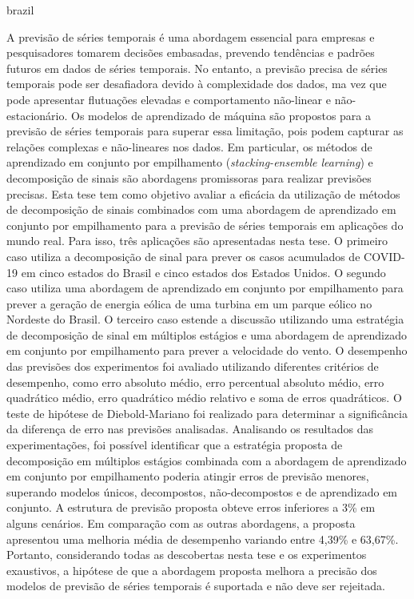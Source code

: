 \setlength{\absparsep}{18pt} %
\begin{resumo}[Resumo]
\begin{otherlanguage*}{brazil}

A previs\~ao de s\'eries temporais \'e uma abordagem essencial para empresas e pesquisadores tomarem decis\~oes embasadas, prevendo tend\^encias e padr\~oes futuros em dados de s\'eries temporais. 
%
No entanto, a previs\~ao precisa de s\'eries temporais pode ser desafiadora devido \`a complexidade dos dados, ma vez que pode apresentar flutua\c{c}\~oes elevadas e comportamento n\~ao-linear e n\~ao-estacion\'ario. 
%
Os modelos de aprendizado de m\'aquina s\~ao propostos para a previs\~ao de s\'eries temporais para superar essa limita\c{c}\~ao, pois podem capturar as rela\c{c}\~oes complexas e n\~ao-lineares nos dados. Em particular, os métodos de aprendizado em conjunto por empilhamento (\textit{stacking-ensemble learning}) e decomposi\c{c}\~ao de sinais s\~ao abordagens promissoras para realizar previs\~oes precisas.
%
Esta tese tem como objetivo avaliar a efic\'acia da utiliza\c{c}\~ao de m\'etodos de decomposi\c{c}\~ao de sinais combinados com uma abordagem de aprendizado em conjunto por empilhamento para a previs\~ao de s\'eries temporais em aplica\c{c}\~oes do mundo real. 
%
Para isso, tr\^es aplica\c{c}\~oes s\~ao apresentadas nesta tese. O primeiro caso utiliza a decomposi\c{c}\~ao de sinal para prever os casos acumulados de COVID-19 em cinco estados do Brasil e cinco estados dos Estados Unidos. O segundo caso utiliza uma abordagem de aprendizado em conjunto por empilhamento para prever a gera\c{c}\~ao de energia e\'olica de uma turbina em um parque e\'olico no Nordeste do Brasil. O terceiro caso estende a discuss\~ao utilizando uma estratégia de decomposi\c{c}\~ao de sinal em m\'ultiplos est\'agios e uma abordagem de aprendizado em conjunto por empilhamento para prever a velocidade do vento.
%
O desempenho das previs\~oes dos experimentos foi avaliado utilizando diferentes crit\'erios de desempenho, como erro absoluto m\'edio, erro percentual absoluto m\'edio, erro quadr\'atico m\'edio, erro quadr\'atico m\'edio relativo e soma de erros quadr\'aticos. O teste de hip\'otese de Diebold-Mariano foi realizado para determinar a signific\^ancia da diferen\c{c}a de erro nas previs\~oes analisadas. 
%
Analisando os resultados das experimenta\c{c}\~oes, foi poss\'ivel identificar que a estrat\'egia proposta de decomposi\c{c}\~ao em m\'ultiplos est\'agios combinada com a abordagem de aprendizado em conjunto por empilhamento poderia atingir erros de previs\~ao menores, superando modelos \'unicos, decompostos, n\~ao-decompostos e de aprendizado em conjunto.
%
A estrutura de previs\~ao proposta obteve erros inferiores a 3\% em alguns cen\'arios. Em comparação com as outras abordagens, a proposta apresentou uma melhoria m\'edia de desempenho variando entre 4,39\% e 63,67\%.
%
Portanto, considerando todas as descobertas nesta tese e os experimentos exaustivos, a hip\'otese de que a abordagem proposta melhora a precis\~ao dos modelos de previs\~ao de s\'eries temporais \'e suportada e n\~ao deve ser rejeitada.
    

\end{otherlanguage*}
\end{resumo}

